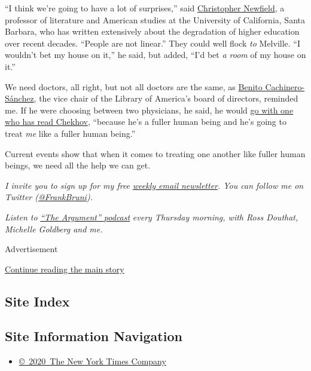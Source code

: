 ``I think we're going to have a lot of surprises,'' said
\href{https://www.english.ucsb.edu/people/newfield-christopher}{Christopher
Newfield}, a professor of literature and American studies at the
University of California, Santa Barbara, who has written extensively
about the degradation of higher education over recent decades. ``People
are not linear.'' They could well flock \emph{to} Melville. ``I wouldn't
bet my house on it,'' he said, but added, ``I'd bet \emph{a room} of my
house on it.''

We need doctors, all right, but not all doctors are the same, as
\href{https://www.egonzehnder.com/office/new-york/consultant/benito-cachinero}{Benito
Cachinero-Sánchez}, the vice chair of the Library of America's board of
directors, reminded me. If he were choosing between two physicians, he
said, he would
\href{https://www.theatlantic.com/health/archive/2018/07/medicine-doctors-fiction/566342/}{go
with one who has read Chekhov}, ``because he's a fuller human being and
he's going to treat \emph{me} like a fuller human being.''

Current events show that when it comes to treating one another like
fuller human beings, we need all the help we can get.

\emph{I invite you to sign up for my free}
\href{https://www.nytimes.com/newsletters/frank-bruni}{\emph{weekly
email newsletter}}\emph{. You can follow me on Twitter
(}\href{https://twitter.com/FrankBruni}{\emph{@FrankBruni}}\emph{).}

\emph{Listen to}
\href{https://www.nytimes.com/column/the-argument}{\emph{``The
Argument'' podcast}} \emph{every Thursday morning, with Ross Douthat,
Michelle Goldberg and me.}

Advertisement

\protect\hyperlink{after-bottom}{Continue reading the main story}

\hypertarget{site-index}{%
\subsection{Site Index}\label{site-index}}

\hypertarget{site-information-navigation}{%
\subsection{Site Information
Navigation}\label{site-information-navigation}}

\begin{itemize}
\tightlist
\item
  \href{https://help.nytimes.com/hc/en-us/articles/115014792127-Copyright-notice}{©~2020~The
  New York Times Company}
\end{itemize}

